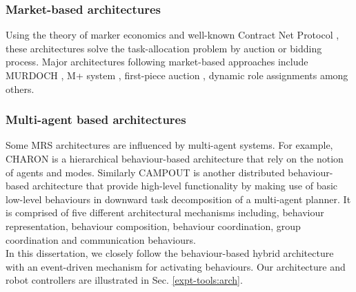 \subsubsection*{Market-based architectures}
Using the theory of marker economics and well-known Contract Net Protocol \cite{Davis1988+}, these architectures solve the task-allocation problem by auction or bidding process. Major architectures following market-based approaches include MURDOCH \cite{Gerkey+2002}, M+ system \cite{Botelho+1999}, first-piece auction \cite{Zlot+2002}, dynamic role assignments \cite{Chaimowicz2002} among others.
\subsubsection*{Multi-agent based architectures}
Some MRS architectures are influenced by multi-agent systems. For example, CHARON is a hierarchical behaviour-based architecture that rely on the notion of agents and modes. Similarly CAMPOUT is another distributed behaviour-based architecture that provide high-level functionality by making use of basic low-level behaviours in downward task decomposition of a multi-agent planner. It is comprised of five different architectural mechanisms including, behaviour representation, behaviour composition, behaviour coordination, group coordination and communication behaviours.\\
In this dissertation, we closely follow the behaviour-based hybrid architecture with an event-driven mechanism for activating behaviours. Our architecture and robot controllers are illustrated in Sec. \ref{expt-tools:arch}.

